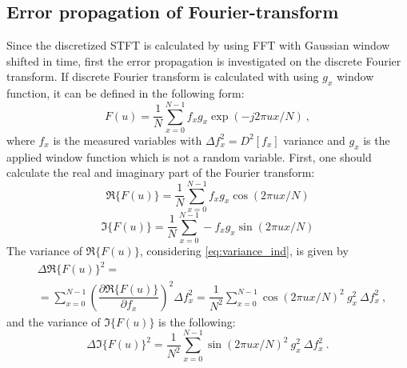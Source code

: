 \documentclass[a4paper,12pt,oneside]{article}
\begin{document}
\subsection{Error propagation of Fourier-transform}\label{sec:ep_analytical}

Since the discretized STFT is calculated by using FFT with Gaussian window shifted in time, first the error propagation is investigated on the discrete Fourier transform. If discrete Fourier transform is calculated with using $g_x$ window function, it can be defined in the following form:
\begin{equation}\label{eq:fft}
  F(u) = \frac{1}{N} \sum\limits_{x=0}^{N-1} f_x g_x \exp(-j2\pi ux/N) \ ,
\end{equation}
where $f_x$ is the measured variables with $\Delta f_x^2 = D^2[f_x]$ variance and $g_x$ is the applied window function which is not a random variable. First, one should calculate the real and imaginary part of the Fourier transform:
\begin{equation}\label{eq:re}
  \Re\{F(u)\} = \frac{1}{N} \sum\limits_{x=0}^{N-1} f_x g_x \cos(2\pi ux/N)
\end{equation}
\begin{equation}\label{eq:im}
  \Im\{F(u)\} = \frac{1}{N} \sum\limits_{x=0}^{N-1} - f_x g_x \sin(2\pi ux/N)
\end{equation}
The variance of $\Re\{F(u)\}$, considering \eqref{eq:variance_ind}, is given by
\begin{eqnarray}\label{eq:dref}
  & \Delta \Re\{F(u)\}^2 = \nonumber\\
  & = \sum\limits_{x=0}^{N-1} 
  \left( \dfrac{\partial \Re\{ F(u) \}}{\partial f_x} \right)^2 \Delta f_x^2 = \dfrac{1}{N^2} \sum\limits_{x=0}^{N-1}  \cos(2\pi ux/N)^2 \ g_x^2 \ \Delta f_x^2 \ ,
\end{eqnarray}
and the variance of $\Im\{F(u)\}$ is the following:
\begin{equation}\label{eq:dimf}
  \Delta \Im\{F(u)\}^2 = \dfrac{1}{N^2} \sum\limits_{x=0}^{N-1}  \sin(2\pi ux/N)^2 \ g_x^2 \ \Delta f_x^2 \ .
\end{equation}
\end{document}
